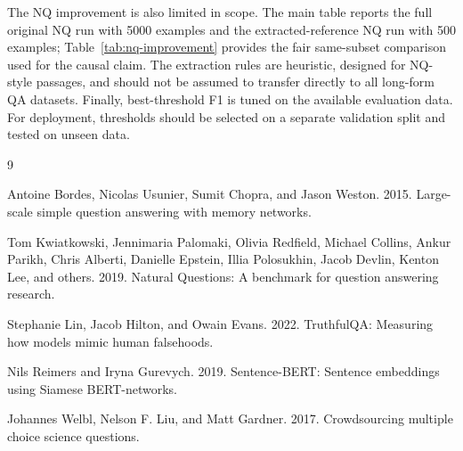\documentclass[11pt]{article}
\begin{document}
The NQ improvement is also limited in scope. The main table reports the full original NQ run with 5000 examples and the extracted-reference NQ run with 500 examples; Table~\ref{tab:nq-improvement} provides the fair same-subset comparison used for the causal claim. The extraction rules are heuristic, designed for NQ-style passages, and should not be assumed to transfer directly to all long-form QA datasets. Finally, best-threshold F1 is tuned on the available evaluation data. For deployment, thresholds should be selected on a separate validation split and tested on unseen data.

\begin{thebibliography}{9}

Antoine Bordes, Nicolas Usunier, Sumit Chopra, and Jason Weston. 2015.
Large-scale simple question answering with memory networks.

Tom Kwiatkowski, Jennimaria Palomaki, Olivia Redfield, Michael Collins, Ankur Parikh,
Chris Alberti, Danielle Epstein, Illia Polosukhin, Jacob Devlin, Kenton Lee, and others. 2019.
Natural Questions: A benchmark for question answering research.

Stephanie Lin, Jacob Hilton, and Owain Evans. 2022.
TruthfulQA: Measuring how models mimic human falsehoods.

Nils Reimers and Iryna Gurevych. 2019.
Sentence-BERT: Sentence embeddings using Siamese BERT-networks.

Johannes Welbl, Nelson F. Liu, and Matt Gardner. 2017.
Crowdsourcing multiple choice science questions.

\end{thebibliography}
\end{document}
